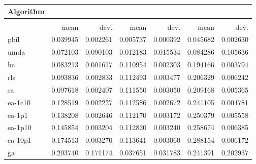 \begin{tabular}{@{} l *{6}{>{{}}N{1}{2}} @{}}
\toprule
{Algorithm} &  \\
\midrule
&  &  &  \\
\midrule
& {mean} & {dev.} & {mean} & {dev.} & {mean} & {dev.} \\
\midrule
pbil & 0.039945 & 0.002261 & 0.005737 & 0.000392 & 0.045682 & 0.002630 \\
umda & 0.072103 & 0.090103 & 0.012183 & 0.015534 & 0.084286 & 0.105636 \\
hc & 0.083213 & 0.001617 & 0.110954 & 0.002303 & 0.194166 & 0.003794 \\
rls & 0.093836 & 0.002833 & 0.112493 & 0.003477 & 0.206329 & 0.006242 \\
sa & 0.097618 & 0.002407 & 0.111550 & 0.003050 & 0.209168 & 0.005365 \\
ea-1c10 & 0.128519 & 0.002227 & 0.112586 & 0.002672 & 0.241105 & 0.004781 \\
ea-1p1 & 0.138208 & 0.002646 & 0.112170 & 0.003172 & 0.250379 & 0.005558 \\
ea-1p10 & 0.145854 & 0.003204 & 0.112820 & 0.003240 & 0.258674 & 0.006385 \\
ea-10p1 & 0.174513 & 0.003270 & 0.113641 & 0.003060 & 0.288154 & 0.006172 \\
ga & 0.203740 & 0.171174 & 0.037651 & 0.031783 & 0.241391 & 0.202937 \\
\bottomrule
\end{tabular}
